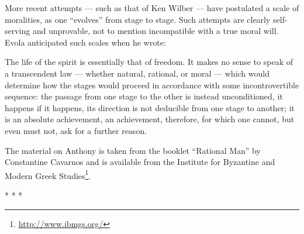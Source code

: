 More recent attempts — such as that of Ken Wilber — have postulated a scale of moralities, as one “evolves” from stage to stage. Such attempts are clearly self-serving and unprovable, not to mention incompatible with a true moral will. Evola anticipated such scales when he wrote:

\begin{quotex}
The life of the spirit is essentially that of freedom. It makes no sense to speak of a transcendent law — whether natural, rational, or moral — which would determine how the stages would proceed in accordance with some incontrovertible sequence: the passage from one stage to the other is instead unconditioned, it happens if it happens, its direction is not deducible from one stage to another; it is an absolute achievement, an achievement, therefore, for which one cannot, but even must not, ask for a further reason.

\end{quotex}

The material on Anthony is taken from the booklet “Rational Man” by Constantine Cavarnos and is available from the Institute for Byzantine and Modern Greek Studies\footnote{\url{http://www.ibmgs.org/}}.


\begin{center}* * *\end{center}

